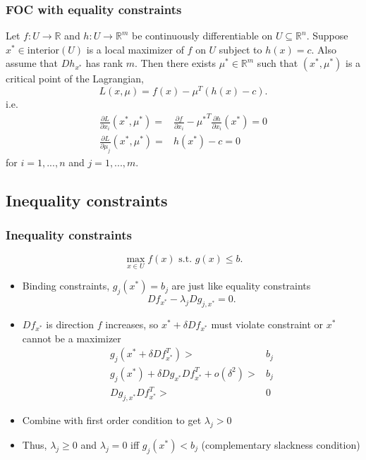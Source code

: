 \documentclass[compress]{beamer}
\def\R{\mathbb{R}}
\renewcommand{\to}{{\rightarrow}}
\begin{document}
\begin{frame}\frametitle{FOC with equality constraints}
\begin{theorem} \label{thm:econ}
  Let $f:U \to \R$ and $h: U \to \R^m$ be continuously
  differentiable on $U \subseteq \R^n$. Suppose $x^* \in
  \mathrm{interior}(U)$ is a local maximizer of $f$ on $U$ subject to 
  $h(x) = c$. Also assume that $Dh_{x^*}$ has rank $m$. Then there
  exists $\mu^* \in \R^m$ such that $(x^*, \mu^*)$ is a critical point
  of the Lagrangian,
  \[ L(x,\mu) = f(x) - \mu^T (h(x) - c). \]
  i.e.
  \begin{align*}
    \frac{\partial L}{\partial x_i}(x^*,\mu^*) = & \frac{\partial
      f}{\partial x_i} - {\mu^*}^T \frac{\partial h}{\partial
      x_i}(x^*) = 0 \\
    \frac{\partial L}{\partial \mu_j}(x^*,\mu^*) = & h(x^*) -
    c = 0
  \end{align*}
  for $i = 1, ..., n$ and $j=1,...,m$.
\end{theorem}
\end{frame}

\subsection{Inequality constraints}
\begin{frame}\frametitle{Inequality constraints}
  \[ \max_{x \in U} f(x) \text{ s.t. } g(x) \leq b. \]
  \begin{itemize}
  \item Binding constraints, $g_j(x^*) = b_j$ are just like equality
    constraints
    \[ Df_{x^*} - \lambda_j D g_{j,x^*} = 0. \]
  \item $Df_{x^*}$ is direction $f$ increases, so $x^* + \delta
    Df_{x^*}$ must violate constraint or $x^*$ cannot be a maximizer
    \begin{align*} 
      g_j(x^* + \delta Df_{x^*}^T) > & b_j \\ 
      g_j(x^*) + \delta Dg_{x^*} Df_{x^*}^T + o(\delta^2) > & b_j \\
      Dg_{j,x^*} Df_{x^*}^T > & 0
    \end{align*}
  \item Combine with first order condition to get $\lambda_j > 0$ 
  \item Thus, $\lambda_j \geq 0$ and $\lambda_j = 0$ iff $g_j(x^*) <
    b_j$ (complementary slackness condition)
  \end{itemize}
\end{frame}
\end{document}
